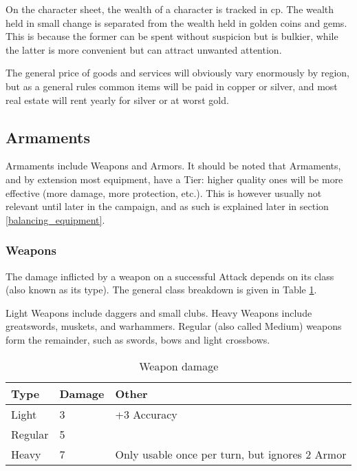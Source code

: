 On the character sheet, the wealth of a character is tracked in cp. The wealth held in small change is separated from the wealth held in golden coins and gems. This is because the former can be spent without suspicion but is bulkier, while the latter is more convenient but can attract unwanted attention.

The general price of goods and services will obviously vary enormously by region, but as a general rules common items will be paid in copper or silver, and most real estate will rent yearly for silver or at worst gold.

\subsection{Armaments}

Armaments include Weapons and Armors. It should be noted that Armaments, and by extension most equipment, have a Tier: higher quality ones will be more effective (more damage, more protection, etc.). This is however usually not relevant until later in the campaign, and as such is explained later in section \ref{balancing_equipment}.

\subsubsection{Weapons}

The damage inflicted by a weapon on a successful Attack depends on its class (also known as its type). The general class breakdown is given in Table \ref{weapon_damage}. 

Light Weapons include daggers and small clubs. Heavy Weapons include greatswords, muskets, and warhammers. Regular (also called Medium) weapons form the remainder, such as swords, bows and light crossbows.

\begin{table}[h!tbp]
	\begin{center}
		\begin{tabular}{p{1.25cm}p{1.5cm}p{4cm}} \toprule
			
			\textbf{Type} & \textbf{Damage} & \textbf{Other} \\ \midrule
			
			Light & 3 & +3 Accuracy \\
			Regular & 5 & \\
			Heavy & 7 & Only usable once per turn, but ignores 2 Armor\\

			\bottomrule
		\end{tabular}
	\end{center}
	\caption{Weapon damage}
	\label{weapon_damage}
\end{table}

